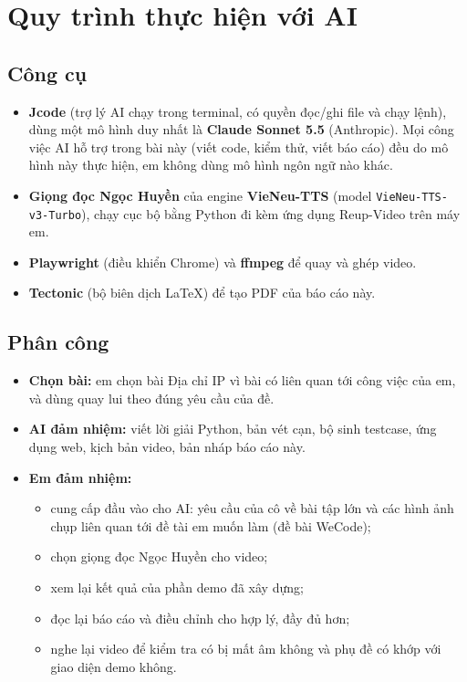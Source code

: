 \documentclass[12pt,a4paper]{article}
\begin{document}
\section{Quy trình thực hiện với AI}

\subsection{Công cụ}
\begin{itemize}
    \item \textbf{Jcode} (trợ lý AI chạy trong terminal, có quyền đọc/ghi file và chạy lệnh), dùng một mô hình duy nhất là \textbf{Claude Sonnet 5.5} (Anthropic). Mọi công việc AI hỗ trợ trong bài này (viết code, kiểm thử, viết báo cáo) đều do mô hình này thực hiện, em không dùng mô hình ngôn ngữ nào khác.
    \item \textbf{Giọng đọc Ngọc Huyền} của engine \textbf{VieNeu-TTS} (model \texttt{VieNeu-TTS-v3-Turbo}), chạy cục bộ bằng Python đi kèm ứng dụng Reup-Video trên máy em.
    \item \textbf{Playwright} (điều khiển Chrome) và \textbf{ffmpeg} để quay và ghép video.
    \item \textbf{Tectonic} (bộ biên dịch LaTeX) để tạo PDF của báo cáo này.
\end{itemize}

\subsection{Phân công}
\begin{itemize}
    \item \textbf{Chọn bài:} em chọn bài Địa chỉ IP vì bài có liên quan tới công việc của em, và dùng quay lui theo đúng yêu cầu của đề.
    \item \textbf{AI đảm nhiệm:} viết lời giải Python, bản vét cạn, bộ sinh testcase, ứng dụng web, kịch bản video, bản nháp báo cáo này.
    \item \textbf{Em đảm nhiệm:}
    \begin{itemize}
        \item cung cấp đầu vào cho AI: yêu cầu của cô về bài tập lớn và các hình ảnh chụp liên quan tới đề tài em muốn làm (đề bài WeCode);
        \item chọn giọng đọc Ngọc Huyền cho video;
        \item xem lại kết quả của phần demo đã xây dựng;
        \item đọc lại báo cáo và điều chỉnh cho hợp lý, đầy đủ hơn;
        \item nghe lại video để kiểm tra có bị mất âm không và phụ đề có khớp với giao diện demo không.
    \end{itemize}
\end{itemize}
\end{document}
